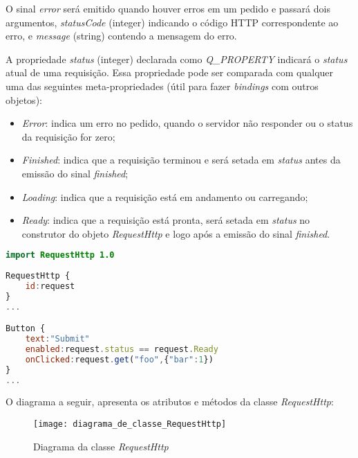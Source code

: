 O sinal \textit{error} será emitido quando houver erros em um pedido e passará dois argumentos, \textit{statusCode} (integer) indicando o código HTTP correspondente ao erro, e \textit{message} (string) contendo a mensagem do erro.\par

A propriedade \textit{status} (integer) declarada como \textit{Q\_PROPERTY} indicará o \textit{status} atual de uma requisição. Essa propriedade pode ser comparada com qualquer uma das seguintes meta-propriedades (útil para fazer \textit{bindings} com outros objetos):

\begin{itemize}
	\item \textit{Error}: indica um erro no pedido, quando o servidor não responder ou o status da requisição for zero;

	\item \textit{Finished}: indica que a requisição terminou e será setada em \textit{status} antes da emissão do sinal \textit{finished};

	\item \textit{Loading}: indica que a requisição está em andamento ou carregando;

	\item \textit{Ready}: indica que a requisição está pronta, será setada em \textit{status} no construtor do objeto \textit{RequestHttp} e logo após a emissão do sinal \textit{finished}.
\end{itemize}

\begin{center}
\begin{lstlisting}[language=qml]
import RequestHttp 1.0 
	
RequestHttp {
	id:request
}
...

Button {
	text:"Submit"
	enabled:request.status == request.Ready
	onClicked:request.get("foo",{"bar":1})
}
...
\end{lstlisting}
\end{center}


O diagrama a seguir, apresenta os atributos e métodos da classe \textit{RequestHttp}:

\begin{figure}[h]
	\texttt{[image: diagrama\_de\_classe\_RequestHttp]}
	\centering
	\caption{Diagrama da classe \textit{RequestHttp}}
\end{figure}


